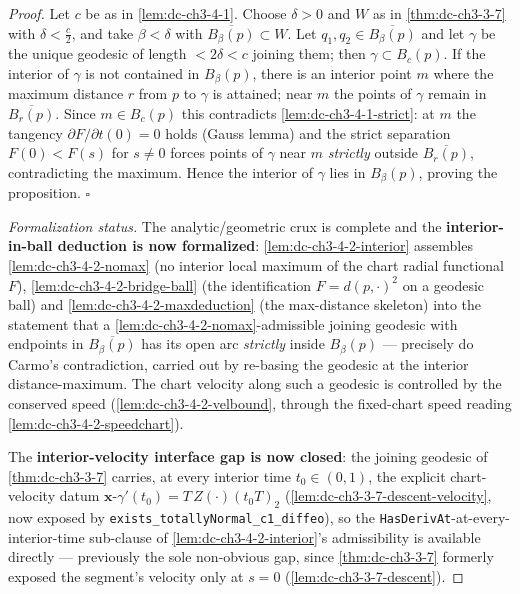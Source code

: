 \begin{proof}
  Let $c$ be as in \cref{lem:dc-ch3-4-1}. Choose $\delta>0$ and $W$ as in \cref{thm:dc-ch3-3-7}
  with $\delta<\frac{c}{2}$, and take $\beta<\delta$ with $\overline{B_\beta(p)}\subset W$. Let
  $q_1,q_2\in\overline{B_\beta(p)}$ and let $\gamma$ be the unique geodesic of length
  $<2\delta<c$ joining them; then $\gamma\subset B_c(p)$. If the interior of
  $\gamma$ is not contained in $B_\beta(p)$, there is an interior point $m$ where the
  maximum distance $r$ from $p$ to $\gamma$ is attained; near $m$ the points of
  $\gamma$ remain in $\overline{B_r(p)}$. Since $m\in B_c(p)$ this contradicts
  \cref{lem:dc-ch3-4-1-strict}: at $m$ the tangency $\partial F/\partial t(0)=0$ holds
  (Gauss lemma) and the strict separation $F(0)<F(s)$ for $s\neq0$ forces points of
  $\gamma$ near $m$ \emph{strictly} outside $\overline{B_r(p)}$, contradicting the
  maximum. Hence the interior of $\gamma$ lies in $B_\beta(p)$, proving the proposition. $\square$

  \emph{Formalization status.} The analytic/geometric crux is complete and the
  \textbf{interior-in-ball deduction is now formalized}: \cref{lem:dc-ch3-4-2-interior} assembles
  \cref{lem:dc-ch3-4-2-nomax} (no interior local maximum of the chart radial functional $F$),
  \cref{lem:dc-ch3-4-2-bridge-ball} (the identification $F=d(p,\cdot)^2$ on a geodesic ball) and
  \cref{lem:dc-ch3-4-2-maxdeduction} (the max-distance skeleton) into the statement that a
  \cref{lem:dc-ch3-4-2-nomax}-admissible joining geodesic with endpoints in $\overline{B_\beta(p)}$
  has its open arc \emph{strictly} inside $B_\beta(p)$ — precisely do Carmo's contradiction, carried
  out by re-basing the geodesic at the interior distance-maximum. The chart velocity along such a
  geodesic is controlled by the conserved speed (\cref{lem:dc-ch3-4-2-velbound}, through the
  fixed-chart speed reading \cref{lem:dc-ch3-4-2-speedchart}).

  The \textbf{interior-velocity interface gap is now closed}: the joining geodesic of
  \cref{thm:dc-ch3-3-7} carries, at every interior time $t_0\in(0,1)$, the explicit chart-velocity datum
  $\mathbf{x}$-$\gamma'(t_0)=T\,Z(\cdot)(t_0T)_2$ (\cref{lem:dc-ch3-3-7-descent-velocity}, now exposed by
  \texttt{exists\_totallyNormal\_c1\_diffeo}), so the \texttt{HasDerivAt}-at-every-interior-time sub-clause of
  \cref{lem:dc-ch3-4-2-interior}'s admissibility is available directly — previously the sole non-obvious gap,
  since \cref{thm:dc-ch3-3-7} formerly exposed the segment's velocity only at $s=0$
  (\cref{lem:dc-ch3-3-7-descent}).


\end{proof}

